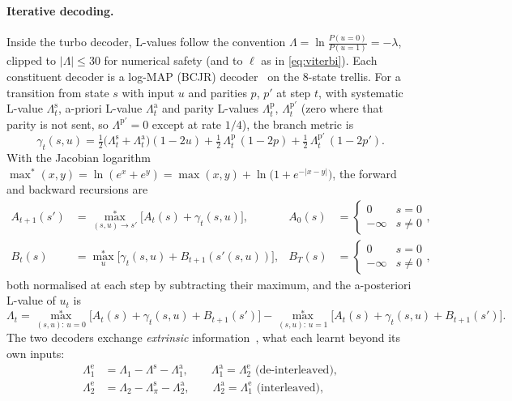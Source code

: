 \documentclass[11pt,a4paper]{article}
\newcommand{\maxstar}{\operatorname{max}^{*}}
\theoremstyle{remark}
\begin{document}
\paragraph{Iterative decoding.}
Inside the turbo decoder, L-values follow the convention $\Lambda = \ln \frac{P(u=0)}{P(u=1)} = -\lambda$, clipped to $|\Lambda| \le 30$ for numerical safety (and to $\ell$ as in \cref{eq:viterbi}). Each constituent decoder is a log-MAP (BCJR) decoder~\cite{bcjr,robertson} on the 8-state trellis. For a transition from state $s$ with input $u$ and parities $p$, $p'$ at step $t$, with systematic L-value $\Lambda^{\mathrm s}_t$, a-priori L-value $\Lambda^{\mathrm a}_t$ and parity L-values $\Lambda^{\mathrm p}_t$, $\Lambda^{\mathrm p'}_t$ (zero where that parity is not sent, so $\Lambda^{\mathrm p'} = 0$ except at rate $1/4$), the branch metric is
\begin{equation}
\gamma_t(s, u) = \tfrac12 \bigl(\Lambda^{\mathrm s}_t + \Lambda^{\mathrm a}_t\bigr)(1 - 2u) + \tfrac12\, \Lambda^{\mathrm p}_t\, (1 - 2p) + \tfrac12\, \Lambda^{\mathrm p'}_t\, (1 - 2p').
\end{equation}
With the Jacobian logarithm $\maxstar(x, y) = \ln(e^x + e^y) = \max(x,y) + \ln\bigl(1 + e^{-|x-y|}\bigr)$, the forward and backward recursions are
\begin{align}
A_{t+1}(s') &= \maxstar_{(s,u) \to s'} \bigl[A_t(s) + \gamma_t(s,u)\bigr], & A_0(s) &= \begin{cases}0 & s = 0\\ -\infty & s \ne 0\end{cases},\\
B_t(s) &= \maxstar_{u} \bigl[\gamma_t(s,u) + B_{t+1}(s'(s,u))\bigr], & B_T(s) &= \begin{cases}0 & s = 0\\ -\infty & s \ne 0\end{cases},
\end{align}
both normalised at each step by subtracting their maximum, and the a-posteriori L-value of $u_t$ is
\begin{equation}
\Lambda_t = \maxstar_{(s,u):\,u=0} \bigl[A_t(s) + \gamma_t(s,u) + B_{t+1}(s')\bigr] - \maxstar_{(s,u):\,u=1} \bigl[A_t(s) + \gamma_t(s,u) + B_{t+1}(s')\bigr].
\end{equation}
The two decoders exchange \emph{extrinsic} information~\cite{hagenauer96}, what each learnt beyond its own inputs:
\begin{align}
\Lambda^{\mathrm e}_{1} &= \Lambda_{1} - \Lambda^{\mathrm s} - \Lambda^{\mathrm a}_{1}, \qquad \Lambda^{\mathrm a}_{1} = \Lambda^{\mathrm e}_{2} \text{ (de-interleaved)},\\
\Lambda^{\mathrm e}_{2} &= \Lambda_{2} - \Lambda^{\mathrm s}_{\pi} - \Lambda^{\mathrm a}_{2}, \qquad \Lambda^{\mathrm a}_{2} = \Lambda^{\mathrm e}_{1} \text{ (interleaved)},
\end{align}
\end{document}

